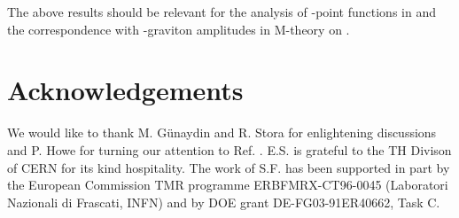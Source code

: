 \documentclass[a4paper,12pt]{article}
\begin{document}
The above results should be relevant for the analysis of \coordHE{}-point 
functions in \coordHE{} and the correspondence with \coordHE{}-graviton 
amplitudes in M-theory on \coordHE{} \cite{C,B}. 



 

 

 \section*{Acknowledgements}

We would like to thank M. G\"unaydin and R. Stora for enlightening 
discussions and P. Howe for turning our attention to Ref. 
\cite{Howe}. E.S. is grateful to the TH Divison of CERN for its 
kind hospitality. The work of S.F. has been supported in part by 
the European Commission TMR programme ERBFMRX-CT96-0045 
(Laboratori Nazionali di Frascati, INFN) and by DOE grant 
DE-FG03-91ER40662, Task C. 


\vfill\eject
\end{document}
